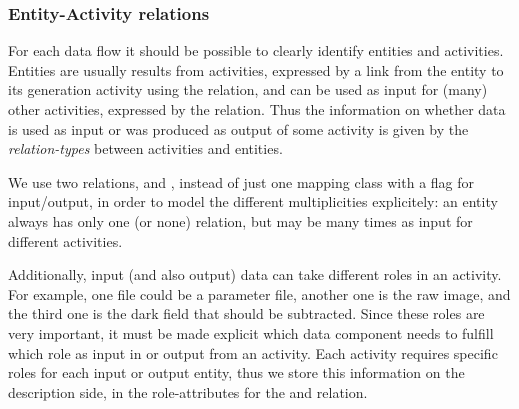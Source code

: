 


\subsubsection{Entity-Activity relations}\label{sec:entity-activity-relations}

For each data flow it should be possible to clearly identify entities and 
activities. 
Entities are usually results from activities, expressed by a link from 
the entity to its generation activity using the  relation,
and can be used as input for (many) other activities, expressed by the  relation.
Thus the information on whether data is used as input or was produced as output of 
some activity is given by the \emph{relation-types} between activities and entities.

We use two relations,  and , instead of just one
mapping class with a flag for input/output, in order to model the different 
multiplicities explicitely: an entity always has only one (or none) 
 relation, but may be  many times as input for 
different activities.


Additionally, input (and also output) data can take different roles in an 
activity. For example, one file could
be a parameter file, another one is the raw image, and the third one is the 
dark field that should be subtracted. Since these roles are very important, 
it must be made explicit which data component needs to fulfill which role as 
input in or output from an activity.
Each activity requires specific roles for each input or output entity, thus 
we store this information on the description side, in the role-attributes for 
the  and  relation.



